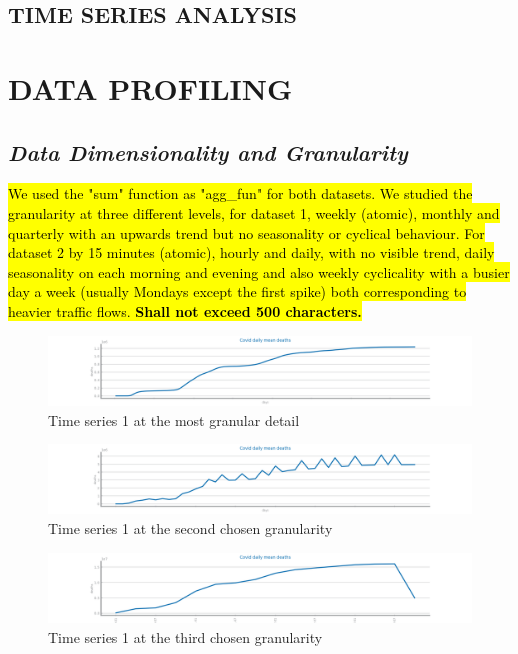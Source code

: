\documentclass[10pt]{extarticle}
\newcommand{\ctext}[3][RGB]{%
  \begingroup
  \definecolor{hlcolor}{#1}{#2}\sethlcolor{hlcolor}%
  \hl{#3}%
  \endgroup
}
\begin{document}
\begin{center}
	\section*{\fontsize{0.75cm}{1cm}\selectfont TIME SERIES ANALYSIS}
\end{center}

\section{DATA PROFILING}

\subsection*{\textit{Data Dimensionality and Granularity}}
\ctext[RGB]{190,190,190}{We used the "sum" function as "agg\_fun" for both datasets. We studied the granularity at three different levels, for dataset 1, weekly (atomic), monthly and quarterly with an upwards trend but no seasonality or cyclical behaviour. For dataset 2 by 15 minutes (atomic), hourly and daily, with no visible trend, daily seasonality on each morning and evening and also weekly cyclicality with a busier day a week (usually Mondays except the first spike) both corresponding to heavier traffic flows. \textbf{Shall not exceed 500 characters.}}

\begin{figure}[H]
\centering\includegraphics[scale=0.5]{images/dataset1/time_series/Covid_granularity_aggregation_W.png}
\caption{Time series 1 at the most granular detail}
\end{figure}

\begin{figure}[H]
\centering\includegraphics[scale=0.5]{images/dataset1/time_series/Covid_granularity_aggregation_M.png}
\caption{Time series 1 at the second chosen granularity}
\end{figure}

\begin{figure}[H]
\centering\includegraphics[scale=0.5]{images/dataset1/time_series/Covid_granularity_aggregation_Q.png}
\caption{Time series 1 at the third chosen granularity}
\end{figure}
\end{document}
